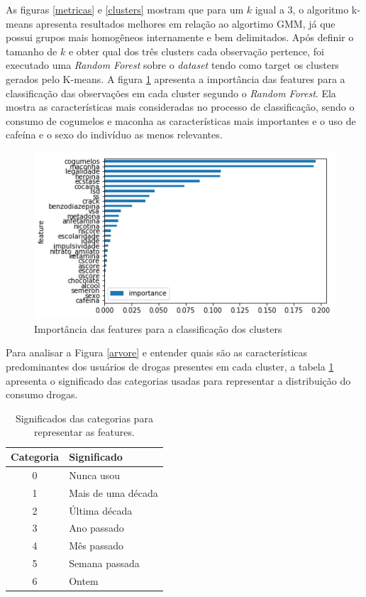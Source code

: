 \documentclass{article}
\begin{document}
As figuras \ref{metricas} e \ref{clusters} mostram que para um $k$ igual a 3, o algoritmo k-means apresenta resultados melhores em relação ao algortimo GMM, já que possui grupos mais homogêneos internamente e bem delimitados. Após definir o tamanho de $k$ e obter qual dos três clusters cada observação pertence, foi executado uma \textit{Random Forest} \citep{Breiman2001} sobre o \textit{dataset} tendo como target os clusters gerados pelo K-means. A figura \ref{feature_importance} apresenta a importância das features para a classificação das observações em cada cluster segundo o \textit{Random Forest}. Ela mostra as características mais consideradas no processo de classificação, sendo o consumo de cogumelos e maconha as características mais importantes e o uso de cafeína e o sexo do indivíduo as menos relevantes.

\begin{figure}[H]
\centering
    \includegraphics[width=120mm]{resultados/feature_importance_original}
\caption{Importância das features para a classificação dos clusters}
\label{feature_importance}
\end{figure}

Para analisar a Figura \ref{arvore} e entender quais são as características predominantes dos usuários de drogas presentes em cada cluster, a tabela \ref{categorias} apresenta o significado das categorias usadas para representar a distribuição do consumo drogas. 

\begin{table}[H]
\centering
\begin{tabular}{|c|l|}
\hline
Categoria & Significado        \\ \hline
0                       & Nunca usou         \\ \hline
1                       & Mais de uma década \\ \hline
2                       & Última década      \\ \hline
3                       & Ano passado        \\ \hline
4                       & Mês passado        \\ \hline
5                       & Semana passada     \\ \hline
6                       & Ontem              \\ \hline
\end{tabular}
\caption{Significados das categorias para representar as features.}
\label{categorias}
\end{table}
\end{document}
